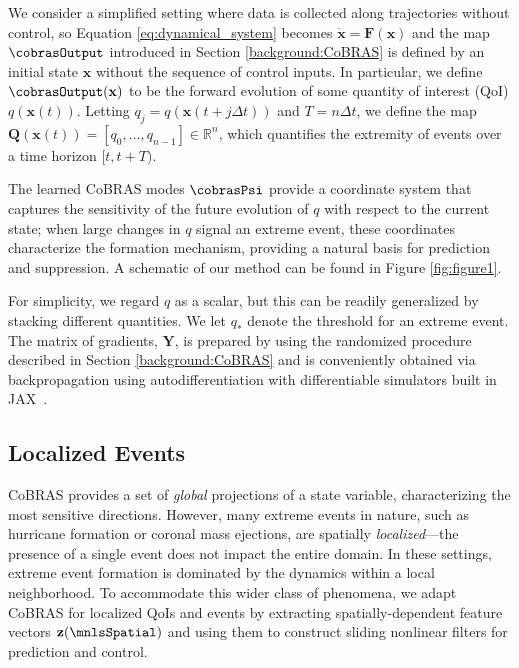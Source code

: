 \documentclass[twocolumn,10pt]{article}
\begin{document}
We consider a simplified setting where data is collected along trajectories without control, so Equation \ref{eq:dynamical_system}  becomes $\mathbf{\dot x} = \mathbf F(\mathbf{x})$ and the map $\cobrasOutput$ introduced in Section \ref{background:CoBRAS} is defined by an initial state $\mathbf x$ without the sequence of control inputs. 
%
In particular, we define $\cobrasOutput(\mathbf x)$ to be the forward evolution of some quantity of interest (QoI) $q(\mathbf x(t))$. 
%
Letting 
$q_j = q(\mathbf x(t + j\Delta t))$ and $T = n\Delta t$, 
we define the map
$\mathbf{Q}(\mathbf x(t)) = [q_0, \dots  , q_{n-1}] \in \mathbb R ^{n}$, 
which quantifies the extremity of events over a time horizon $[t, t+T)$.

The learned CoBRAS modes $\cobrasPsi$ provide a coordinate system that captures the sensitivity of the future evolution of $q$ with respect to the current state; when large changes in $q$ signal an extreme event, these coordinates characterize the formation mechanism, providing a natural basis for prediction and suppression. A schematic of our method can be found in Figure \ref{fig:figure1}.
%

For simplicity, we regard $q$ as a scalar, but this can be readily generalized by stacking different quantities. We let $q_*$ denote the threshold for an extreme event.
The matrix of gradients, $\mathbf Y$, is prepared by using the randomized procedure described in Section \ref{background:CoBRAS} and is conveniently obtained via backpropagation using autodifferentiation with differentiable simulators built in JAX~\cite{jax2018github}.

\subsection{Localized Events}
\label{sec:methods_local_cobras}
CoBRAS provides a set of \textit{global} projections of a state variable, characterizing the most sensitive directions. However, many extreme events in nature, such as hurricane formation or coronal mass ejections, are spatially \emph{localized}---the presence of a single event does not impact the entire domain. In these settings, extreme event formation is dominated by the dynamics within a local neighborhood. To accommodate this wider class of phenomena, we adapt CoBRAS for localized QoIs and events by extracting spatially-dependent feature vectors $\mathbf z(\mnlsSpatial)$ and using them to construct sliding nonlinear filters for prediction and control.  
\end{document}
